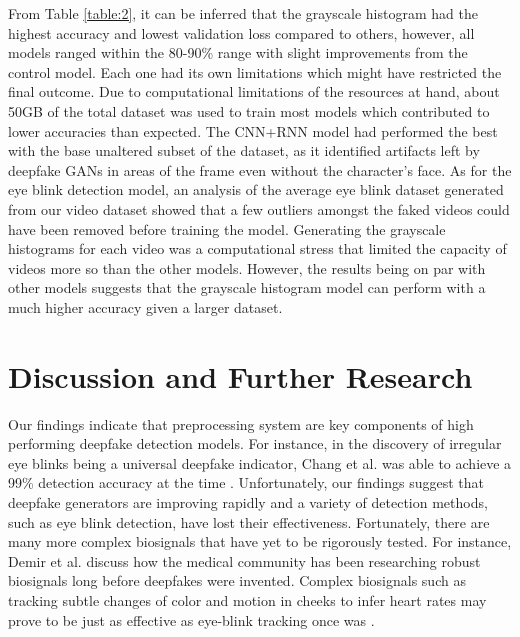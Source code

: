 \documentclass[a4paper]{article}
\begin{document}
From Table \ref{table:2}, it can be inferred that the grayscale histogram had the highest accuracy and lowest validation loss compared to others, however, all models ranged within the 80-90\% range with slight improvements from the control model. Each one had its own limitations which might have restricted the final outcome. Due to computational limitations of the resources at hand, about 50GB of the total dataset was used to train most models which contributed to lower accuracies than expected. The CNN+RNN model had performed the best with the base unaltered subset of the dataset, as it identified artifacts left by deepfake GANs in areas of the frame even without the character's face. As for the eye blink detection model, an analysis of the average eye blink dataset generated from our video dataset showed that a few outliers amongst the faked videos could have been removed before training the model. Generating the grayscale histograms for each video was a computational stress that limited the capacity of videos more so than the other models. However, the results being on par with other models suggests that the grayscale histogram model can perform with a much higher accuracy given a larger dataset.

\section{Discussion and Further Research}

Our findings indicate that preprocessing system are key components of high performing deepfake detection models. For instance, in the discovery of irregular eye blinks being a universal deepfake indicator, Chang et al. was able to achieve a 99\% detection accuracy at the time \cite{eye}. Unfortunately, our findings suggest that deepfake generators are improving rapidly and a variety of detection methods, such as eye blink detection, have lost their effectiveness. Fortunately, there are many more complex biosignals that have yet to be rigorously tested. For instance, Demir et al. discuss how the medical community has been researching robust biosignals long before deepfakes were invented. Complex biosignals such as tracking subtle changes of color and motion in cheeks to infer heart rates may prove to be just as effective as eye-blink tracking once was \cite{biosignals}. 
\end{document}

